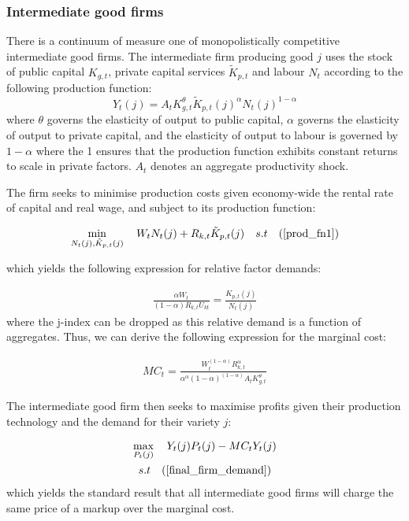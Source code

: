 \documentclass[titlepage, 11pt, a4paper]{article}
\renewcommand{\&}{and}
\begin{document}
\begin{appendices}
\subsubsection{Intermediate good firms}
There is a continuum of measure one of monopolistically competitive intermediate good firms. The intermediate firm producing good $j$ uses the stock of public capital $K_{g,t}$, private capital services $\tilde{K}_{p,t}$ and labour $N_t$ according to the following production function: 
\begin{equation} \label{prod_fn1} 
    Y_t(j) = A_t K_{g,t}^{\theta}\tilde{K}_{p,t}(j)^{\alpha}N_t(j)^{1-\alpha}
\end{equation}
where $\theta$ governs the elasticity of output to public capital, $\alpha$ governs the elasticity of output to private capital, and the elasticity of output to labour is governed by $1-\alpha$ where the 1 ensures that the production function exhibits constant returns to scale in private factors. $A_t$ denotes an aggregate productivity shock.

The firm seeks to minimise production costs given economy-wide the rental rate of capital and real wage, and subject to its production function: 

\begin{gather*}
    \min\limits_{N_t(j),\tilde{K}_{p,t}(j) } \quad W_tN_t(j) + R_{k,t}\tilde{K}_{p,t}(j) \quad 
    s.t \quad (\ref{prod_fn1})
\end{gather*}

which yields the following expression for relative factor demands: 

\begin{gather}
    \frac{\alpha W_t}{(1-\alpha)R_{k,t}U_{kt}} = \frac{{K}_{p,t}(j)}{N_t(j)}
\end{gather}
where the j-index can be dropped as this relative demand is a function of aggregates. Thus, we can derive the following expression for the marginal cost: 

\begin{gather}
    MC_t = \frac{W_t^{(1-\alpha)}R_{k,t}^{\alpha}}{\alpha^\alpha (1-\alpha)^{(1-\alpha)} A_t K_{g,t}^\theta}
\end{gather}

The intermediate good firm then seeks to maximise profits given their production technology and the demand for their variety $j$: 

\begin{gather*}
    \max\limits_{P_t(j)} \quad Y_t(j)P_t(j) - MC_t Y_t(j) \\
    s.t \quad (\ref{final_firm_demand})
\end{gather*}
which yields the standard result that all intermediate good firms will charge the same price of a markup over the marginal cost.



\end{appendices}
\end{document}
